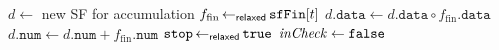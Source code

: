 \begin{algorithm}[t]
\begin{minipage}[t]{.48\textwidth}
\begin{algorithmic}[1]
                \State \Return
            \EndIf
                \State \Return
            \EndIf
        \EndFor
        \State $d \gets$ new SF for accumulation
         \label{line:epoch-based:accumulate}
            \State $f_\mathrm{fin} \operatorname{\gets_\mathsf{relaxed}} \mathtt{sfFin}[t]$
            \State $d\mathtt{.data}
                \gets d\mathtt{.data} \circ f_\mathrm{fin}\mathtt{.data}$
            \State $d\mathtt{.num}
                \gets d\mathtt{.num} + f_\mathrm{fin}\mathtt{.num}$
        \EndFor
         \label{line:epoch-based:convergence}
            \State $\mathtt{stop} \operatorname{\gets_\mathsf{relaxed}} \texttt{true}$ \label{line:epoch-based:do-stop}
        \EndIf
        \State $\mathit{inCheck} \gets \texttt{false}$
    \EndProcedure
\end{algorithmic}
\end{minipage}
\end{algorithm}
